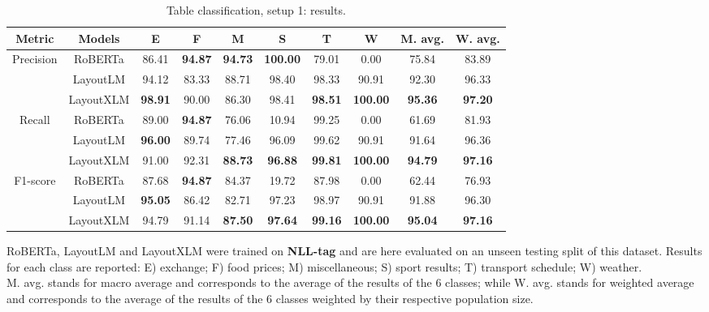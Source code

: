 \begin{table}[htp]
\begin{center}
\begin{tabular}{cc|cccccc|cc}
Metric & Models & E & F & M & S & T & W & M. avg. & W. avg.  \\
\hline
Precision & RoBERTa & 86.41 & \textbf{94.87} & \textbf{94.73} & \textbf{100.00} & 79.01 & 0.00 & 75.84 & 83.89\\
 & LayoutLM & 94.12 & 83.33 & 88.71 & 98.40 & 98.33 & 90.91 & 92.30 & 96.33  \\
 & LayoutXLM & \textbf{98.91} & 90.00 & 86.30 & 98.41 & \textbf{98.51} & \textbf{100.00} & \textbf{95.36} & \textbf{97.20}  \\
 \hline
Recall & RoBERTa & 89.00 & \textbf{94.87} & 76.06 & 10.94 & 99.25 & 0.00 & 61.69 & 81.93\\
 & LayoutLM & \textbf{96.00} & 89.74 & 77.46 & 96.09 & 99.62 & 90.91 & 91.64 & 96.36  \\
  & LayoutXLM & 91.00 & 92.31 & \textbf{88.73} & \textbf{96.88} & \textbf{99.81} & \textbf{100.00} & \textbf{94.79} & \textbf{97.16}  \\
   \hline
 F1-score & RoBERTa & 87.68 & \textbf{94.87} & 84.37 & 19.72 & 87.98 & 0.00 & 62.44 & 76.93  \\
 & LayoutLM & \textbf{95.05} & 86.42 & 82.71 & 97.23 & 98.97 & 90.91 & 91.88 & 96.30  \\
  & LayoutXLM & 94.79 & 91.14 & \textbf{87.50} & \textbf{97.64} & \textbf{99.16} & \textbf{100.00} & \textbf{95.04} & \textbf{97.16}  \\
   \hline
\end{tabular}
\end{center}
\caption{Table classification, setup 1: results.}
\medskip
\small
RoBERTa, LayoutLM and LayoutXLM were trained on \textbf{NLL-tag} and are here evaluated on an unseen testing split of this dataset. Results for each class are reported: E) exchange; F) food prices; M) miscellaneous; S) sport results; T) transport schedule; W) weather. \\
M. avg. stands for macro average and corresponds to the average of the results of the 6 classes; while W. avg. stands for weighted average and corresponds to the average of the results of the 6 classes weighted by their respective population size.
\label{table_classification_setup1_results}
\end{table}%

